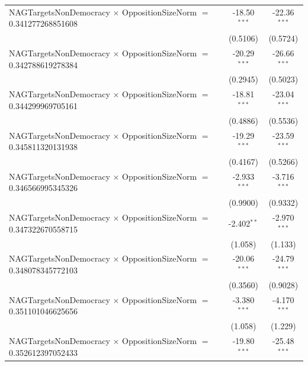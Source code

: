 \begin{tabular}{lcc}
   NAGTargetsNonDemocracy $\times$ OppositionSizeNorm $=$ 0.341277268851608     & -18.50$^{***}$       & -22.36$^{***}$\\   
                                                                                & (0.5106)             & (0.5724)\\   
   NAGTargetsNonDemocracy $\times$ OppositionSizeNorm $=$ 0.342788619278384     & -20.29$^{***}$       & -26.66$^{***}$\\   
                                                                                & (0.2945)             & (0.5023)\\   
   NAGTargetsNonDemocracy $\times$ OppositionSizeNorm $=$ 0.344299969705161     & -18.81$^{***}$       & -23.04$^{***}$\\   
                                                                                & (0.4886)             & (0.5536)\\   
   NAGTargetsNonDemocracy $\times$ OppositionSizeNorm $=$ 0.345811320131938     & -19.29$^{***}$       & -23.59$^{***}$\\   
                                                                                & (0.4167)             & (0.5266)\\   
   NAGTargetsNonDemocracy $\times$ OppositionSizeNorm $=$ 0.346566995345326     & -2.933$^{***}$       & -3.716$^{***}$\\   
                                                                                & (0.9900)             & (0.9332)\\   
   NAGTargetsNonDemocracy $\times$ OppositionSizeNorm $=$ 0.347322670558715     & -2.402$^{**}$        & -2.970$^{***}$\\   
                                                                                & (1.058)              & (1.133)\\   
   NAGTargetsNonDemocracy $\times$ OppositionSizeNorm $=$ 0.348078345772103     & -20.06$^{***}$       & -24.79$^{***}$\\   
                                                                                & (0.3560)             & (0.9028)\\   
   NAGTargetsNonDemocracy $\times$ OppositionSizeNorm $=$ 0.351101046625656     & -3.380$^{***}$       & -4.170$^{***}$\\   
                                                                                & (1.058)              & (1.229)\\   
   NAGTargetsNonDemocracy $\times$ OppositionSizeNorm $=$ 0.352612397052433     & -19.80$^{***}$       & -25.48$^{***}$\\   

\end{tabular}
